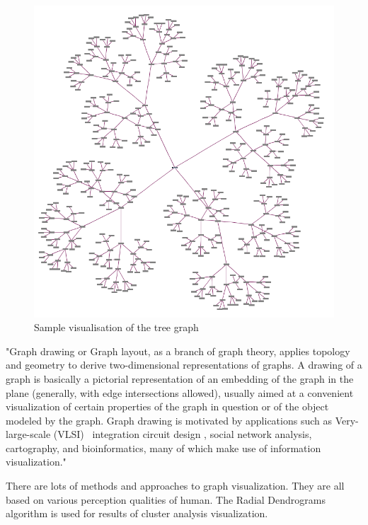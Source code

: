 \begin{figure}[h!]
\centering
\includegraphics[scale=0.3]{pictures/Tree_graph_example.png}
\caption{Sample visualisation of the tree graph}
\label{fig:tree_graph_example}
\end{figure}

"Graph drawing or Graph layout, as a branch of graph theory, applies topology and geometry to derive two-dimensional representations of graphs. A drawing of a graph is basically a pictorial representation of an embedding of the graph in the plane (generally, with edge intersections allowed), usually aimed at a convenient visualization of certain properties of the graph in question or of the object modeled by the graph. Graph drawing is motivated by applications such as Very-large-scale (VLSI)~\cite{VLSI} integration circuit design , social network analysis, cartography, and bioinformatics, many of which make use of information visualization."~\cite{Graph_drawing}

There are lots of methods and approaches to graph visualization. They are all based on various perception qualities of human. The Radial Dendrograms~\cite{Radial_dendrogram} algorithm is used for results of cluster analysis visualization.


